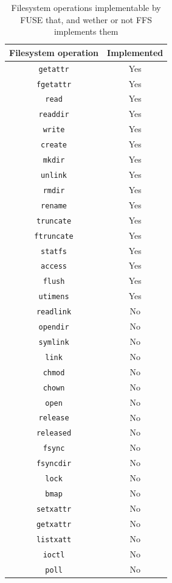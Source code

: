 \begin{table}[!ht]
	\begin{center}
		\caption{Filesystem operations implementable by FUSE that, and wether or not FFS implements them}
		\begin{tabular}{| c | c |}
			
			\hline
			\textbf{Filesystem operation} 	& \textbf{Implemented}\\
			\hline
			\hline
			\texttt{getattr} & Yes\\
			\texttt{fgetattr} & Yes\\
			\texttt{read} & Yes\\
			\texttt{readdir} & Yes\\
			\texttt{write} & Yes\\
			\texttt{create} & Yes\\
			\texttt{mkdir} & Yes\\
			\texttt{unlink} & Yes\\
			\texttt{rmdir} & Yes\\
			\texttt{rename} & Yes\\
			\texttt{truncate} & Yes\\
			\texttt{ftruncate} & Yes\\
			\texttt{statfs} & Yes\\
			\texttt{access} & Yes\\
			\texttt{flush} & Yes\\
			\texttt{utimens} & Yes\\
			\texttt{readlink} & No\\
			\texttt{opendir} & No\\
			\texttt{symlink} & No\\
			\texttt{link} & No\\
			\texttt{chmod} & No\\
			\texttt{chown} & No\\
			\texttt{open} & No\\
			\texttt{release} & No\\
			\texttt{released} & No\\
			\texttt{fsync} & No\\
			\texttt{fsyncdir} & No\\
			\texttt{lock} & No\\
			\texttt{bmap} & No\\
			\texttt{setxattr} & No\\
			\texttt{getxattr} & No\\
			\texttt{listxatt} & No\\
			\texttt{ioctl} & No\\
			\texttt{poll} & No\\
			\hline

		\end{tabular}
		\label{tbl:fs_impl_op}
	\end{center}
\end{table}

